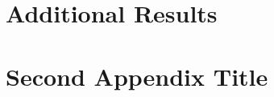 \renewcommand{\theHchapter}{A\arabic{chapter}}
\appendix

\chapter{Additional Results}
\label{app:addResults}


\chapter{Second Appendix Title}
%
